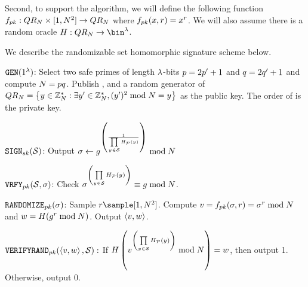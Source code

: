 Second, to support the \randomize algorithm, we will define the following function $\randomizeFn[\pubKey]: 
\qrGroup \times \nats[1][\rsaMod^2] \rightarrow \qrGroup$ 
where $\randomizeFn[\pubKey](\genericFnInput,\genericRand) = \genericFnInput^{\genericRand}$. We will also assume there is a random oracle $\ro: \qrGroup \rightarrow \bin^{\secParam}$. 

We describe the randomizable set homomorphic signature 
scheme \sigScheme below. 

\medskip
\itemListStart

	\item $\keyGen(1^{\secParam})$: Select two safe primes of length 
	$\lambda$-bits $\safePrime[1] = 2 \sgPrime[1] + 1$ and 
	$\safePrime[2] = 2 \sgPrime[2] + 1$ and compute $\rsaMod = \safePrime[1] 
	\safePrime[2]$. Publish \rsaMod, and a random generator \qrGen of $\qrGroup = 
	\setDefn{\genericCInputElmt \in 
		\integersModNInv: \exists \genericCInputElmt' \in \integersModNInv, (\genericCInputElmt')^2 \bmod 
		\rsaMod = \genericCInputElmt}$ as the public key. The order of \qrGroup is the private key.  
	
	
	
	\item $\signingAlg[\privKey](\genericSetVar)$: Output $\genericSig \assign 
	\qrGen^{\left(\frac{1}{\accSetDefn}\right)} \bmod \rsaMod$
	
	
		
	\item $\verify[\pubKey](\genericSetVar, \genericSig)$: Check 
	$\genericSig^{\left(\prod\limits_{\genericCInputElmt \in \genericSetVar} 
	\primeRO(\genericCInputElmt)\right)} \equiv \qrGen \bmod 
	\rsaMod$.
			
	\item $\randomize[\pubKey](\genericSig)$: Sample $\genericRand \sample \nats[1][\rsaMod^2]$. 
	Compute $\genericSigPair[1] = \randomizeFn[\pubKey](\genericSig, \genericRand) = 
	\genericSig^{\genericRand} \bmod \rsaMod$ and $\genericSigPair[2] = 
	\ro(\qrGen^{\genericRand} \bmod \rsaMod)$. Output $\genericSigPair$.
	
	
	\item $\verifyRand[\pubKey](\genericSigPair, \genericSetVar):$ If
	$\ro\left(\genericSigPair[1]^{\left(\prod\limits_{\genericCInputElmt \in \genericSetVar} 
		\primeRO(\genericCInputElmt)\right)} \bmod \rsaMod\right) = \genericSigPair[2]$, then 
		output 1. Otherwise, output 0. 
		
